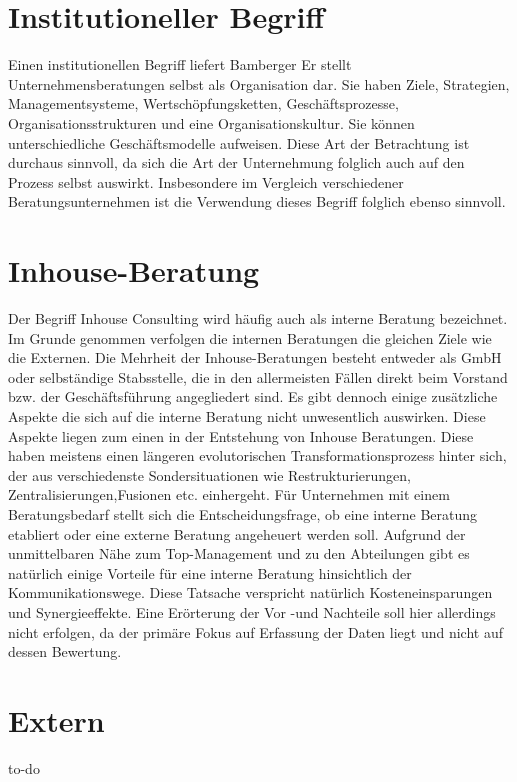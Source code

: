 \section{Institutioneller Begriff}

Einen institutionellen Begriff liefert Bamberger \cite[16]{bamberg2008strategische}
Er stellt Unternehmensberatungen selbst als Organisation dar. Sie haben Ziele, Strategien, Managementsysteme, Wertschöpfungsketten, Geschäftsprozesse, Organisationsstrukturen und eine Organisationskultur. Sie können unterschiedliche Geschäftsmodelle aufweisen. Diese Art der Betrachtung ist durchaus sinnvoll, da sich die Art der Unternehmung folglich auch auf den Prozess selbst auswirkt. Insbesondere im Vergleich verschiedener Beratungsunternehmen ist die Verwendung dieses Begriff folglich ebenso sinnvoll.

\section{Inhouse-Beratung}
Der Begriff Inhouse Consulting wird häufig auch als interne Beratung bezeichnet. \cite[150]{ReinekeBock200709}
Im Grunde genommen verfolgen die internen Beratungen die gleichen Ziele wie die Externen. Die Mehrheit der Inhouse-Beratungen besteht entweder als GmbH oder selbständige Stabsstelle, die in den allermeisten Fällen direkt beim Vorstand bzw. der Geschäftsführung angegliedert sind. \cite[14]{B2_InhouseConsulting}
Es gibt dennoch einige zusätzliche Aspekte die sich auf die interne Beratung nicht unwesentlich auswirken. Diese Aspekte liegen zum einen in der Entstehung von Inhouse Beratungen. Diese haben meistens einen längeren evolutorischen Transformationsprozess hinter sich, der aus verschiedenste Sondersituationen wie Restrukturierungen, Zentralisierungen,Fusionen etc. einhergeht. \cite[160]{Lippold201309}
Für Unternehmen mit einem Beratungsbedarf stellt sich die Entscheidungsfrage, ob eine interne Beratung etabliert oder eine externe Beratung angeheuert werden soll.
Aufgrund der unmittelbaren Nähe zum Top-Management und zu den Abteilungen gibt es natürlich einige Vorteile für eine interne Beratung hinsichtlich der Kommunikationswege.
Diese Tatsache verspricht natürlich Kosteneinsparungen und Synergieeffekte. Eine Erörterung der Vor -und Nachteile soll hier allerdings nicht erfolgen, da der primäre Fokus auf Erfassung der Daten liegt und nicht auf dessen Bewertung.

\section{Extern}
 to-do
